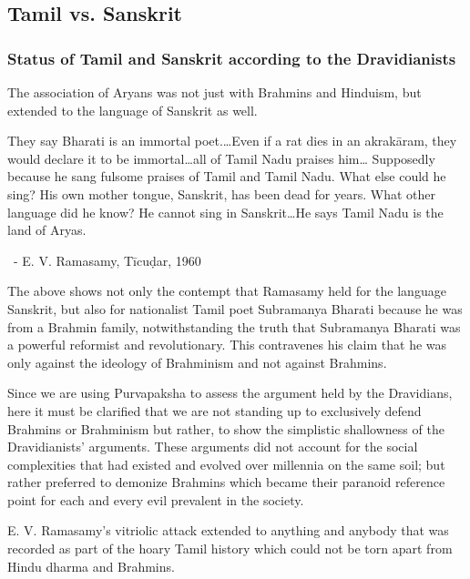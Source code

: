 \subsection*{Tamil vs. Sanskrit}

\subsubsection*{Status of Tamil and Sanskrit according to the Dravidianists}

\vskip -5pt

The association of Aryans was not just with Brahmins and Hinduism, but extended to the language of Sanskrit as well.

\begin{myquote}
They say Bharati is an immortal poet.…Even if a rat dies in an akrakāram, they would declare it to be immortal…all of Tamil Nadu praises him… Supposedly because he sang fulsome praises of Tamil and Tamil Nadu. What else could he sing? His own mother tongue, Sanskrit, has been dead for years. What other language did he know? He cannot sing in Sanskrit…He says Tamil Nadu is the land of Aryas.

~\hfill - E. V. Ramasamy, Tīcuḍar, 1960
\end{myquote}

The above shows not only the contempt that Ramasamy held for the language Sanskrit, but also for nationalist Tamil poet Subramanya Bharati because he was from a Brahmin family, notwithstanding the truth that Subramanya Bharati was a powerful reformist and revolutionary. This contravenes his claim that he was only against the ideology of Brahminism and not against Brahmins.

Since we are using Purvapaksha to assess the argument held by the Dravidians, here it must be clarified that we are not standing up to exclusively defend Brahmins or Brahminism but rather, to show the simplistic shallowness of the Dravidianists’ arguments. These arguments did not account for the social complexities that had existed and evolved over millennia on the same soil; but rather preferred to demonize Brahmins which became their paranoid reference point for each and every evil prevalent in the society.

E. V. Ramasamy’s vitriolic attack extended to anything and anybody that was recorded as part of the hoary Tamil history which could not be torn apart from Hindu dharma and Brahmins.

